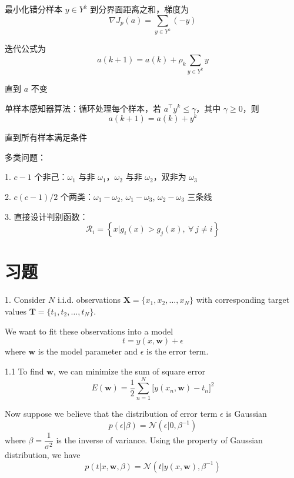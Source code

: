 \documentclass[openany]{ctexbook}
\theoremstyle{kaiti}
\theoremstyle{normal}
\begin{document}
最小化错分样本 $y\in Y^k$ 到分界面距离之和，梯度为
\begin{equation}
\nabla J_p\left(a \right)=\sum_{y\in Y^k}\left(-y \right)
\end{equation}

迭代公式为
\begin{equation}
a\left(k+1 \right)=a\left(k \right)+\rho_k\sum_{y\in Y^k}y
\end{equation}

直到 $a$ 不变

单样本感知器算法：循环处理每个样本，若 $a^{\top}y^k\leqslant \gamma$，其中 $\gamma \geqslant 0$，则 
\begin{equation}
a\left(k+1 \right)=a\left(k \right)+y^k
\end{equation}

直到所有样本满足条件

多类问题：

1. $c-1$ 个非己：$\omega_1$ 与非 $\omega_1$，$\omega_2$ 与非 $\omega_2$，双非为 $\omega_3$

2. $c\left(c-1 \right)/2$ 个两类：$\omega_1-\omega_2$, $\omega_1-\omega_3$, $\omega_2-\omega_3$ 三条线

3. 直接设计判别函数：
\begin{equation}
  \mathcal{R}_i=\left\{ x|g_i(x)>g_j(x),~\forall~j\ne i \right\}
\end{equation}

\section{习题}


1. Consider $N$ i.i.d. observations $\bm{X}=\{x_1,x_2,\dots,x_N\}$ with corresponding target values $\bm{T}=\{t_1,t_2,\dots,t_N\}$.

We want to fit these observations into a model 
\begin{equation}
  t = y(x, \bm{w}) + \epsilon
\end{equation}
where $\bm{w}$ is the model parameter and $\epsilon$ is the error term.

1.1 To find $\bm{w}$, we can minimize the sum of square error
\begin{equation}
\label{eq0}
E(\bm{w}) = \frac{1}{2} \sum_{n=1}^N \big[y(x_n, \bm{w}) - t_n\big]^2
\end{equation}

Now suppose we believe that the distribution of error term $\epsilon$ is Gaussian 
\begin{equation}
  p(\epsilon | \beta) = \mathcal{N} (\epsilon | 0, \beta^{-1})
\end{equation}
where $\beta=\dfrac{1}{\sigma^2}$ is the inverse of variance. Using the property of Gaussian distribution, we have
\begin{equation}
  p(t|x, \bm{w}, \beta) = \mathcal{N} (t|y(x, \bm{w}), \beta^{-1})
\end{equation}
\end{document}

